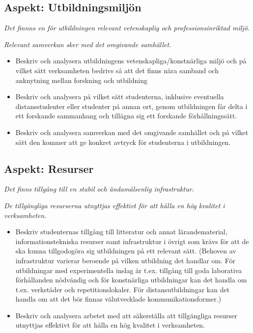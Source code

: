 \documentclass[10pt,article,oneside]{memoir}
\begin{document}
\subsection{Aspekt: Utbildningsmiljön}

\emph{Det finnns en för utbildningen relevant vetenskaplig och professionsinriktad miljö.}

\emph{Relevant samverkan sker med det omgivande samhället.}
    
\begin{itemize}    
\item Beskriv och analysera utbildningens vetenskapliga/konstnärliga miljö och på vilket sätt verksamheten bedrivs så att det finns nära samband och anknytning mellan forskning och utbildning
\item Beskriv och analysera på vilket sätt studenterna, inklusive eventuella distansstudenter eller studenter på annan ort, genom utbildningen får delta i ett forskande sammanhang och tillägna sig ett forskande förhållningssätt.
\item Beskriv och analysera samverkan med det omgivande samhället och på vilket sätt den kommer att ge konkret avtryck för studenterna i utbildningen.
\end{itemize}  

\subsection{Aspekt: Resurser}

\emph{Det finns tillgång till en stabil och ändamålsenlig infrastruktur.}

\emph{De tillgängliga resurserna utnyttjas effektivt för att hålla en hög kvalitet i verksamheten.}
    
\begin{itemize}
\item Beskriv studenternas tillgång till litteratur och annat lärandematerial, informationstekniska resurser samt infrastruktur i övrigt som krävs för att de ska kunna tillgodogöra sig utbildningen på ett relevant sätt. (Behoven av infrastruktur varierar beroende på vilken utbildning det handlar om. För utbildningar med experimentella inslag är t.ex. tillgång till goda laborativa förhållanden nödvändig och för konstnärliga utbildningar kan det handla om t.ex. verkstäder och repetitionslokaler. För distansutbildningar kan det handla om att det bör finnas välutvecklade kommunikationsformer.)
\item Beskriv och analysera arbetet med att säkerställa att tillgängliga resurser utnyttjas effektivt för att hålla en hög kvalitet i verksamheten.
\end{itemize}
\end{document}

